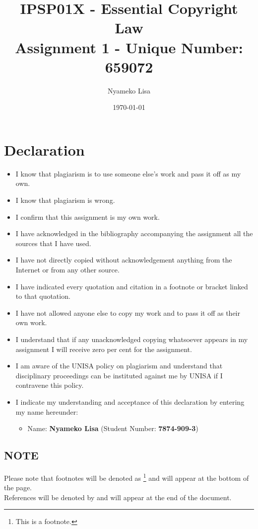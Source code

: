 \documentclass[11pt]{article}
\author{Nyameko Lisa}
\date{\today}
\title{IPSP01X - Essential Copyright Law\\\medskip
\large Assignment 1 - Unique Number: 659072}
\begin{document}
\maketitle
\section*{Declaration}
\label{sec:orgc66427a}
\begin{itemize}
\item I know that plagiarism is to use someone else’s work and pass it off as my own.
\item I know that plagiarism is wrong.
\item I confirm that this assignment is my own work.
\item I have acknowledged in the bibliography accompanying the assignment all the sources that I have used.
\item I have not directly copied without acknowledgement anything from the Internet or from any other source.
\item I have indicated every quotation and citation in a footnote or bracket linked to that quotation.
\item I have not allowed anyone else to copy my work and to pass it off as their own work.
\item I understand that if any unacknowledged copying whatsoever appears in my assignment I will receive zero per cent for the assignment.
\item I am aware of the UNISA policy on plagiarism and understand that disciplinary proceedings can be instituted against me by UNISA if I contravene this policy.
\item I indicate my understanding and acceptance of this declaration by
entering my name hereunder:
\begin{itemize}
\item Name: \textbf{Nyameko Lisa} (Student Number: \textbf{7874-909-3})
\end{itemize}
\end{itemize}

\subsection*{NOTE}
\label{sec:org56c67d2}
Please note that footnotes will be denoted as \footnote{This is a footnote.} and will
appear at the bottom of the page.\\
References will be denoted by \cite{rsa78_copyrightact} and will appear at the end of the document.
\newpage
\end{document}
